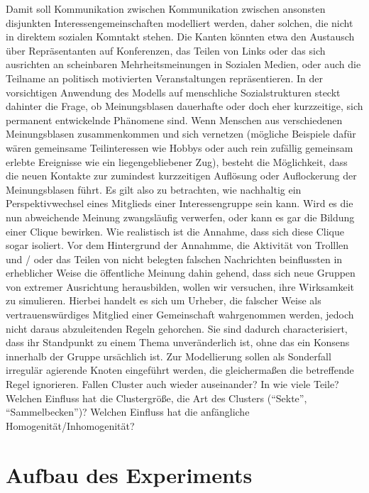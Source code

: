 \documentclass[11pt, a4paper]{scrartcl}
\begin{document}
Damit soll Kommunikation zwischen Kommunikation zwischen ansonsten disjunkten Interessengemeinschaften modelliert werden, daher solchen, die nicht in direktem sozialen Komntakt stehen. Die Kanten könnten etwa den Austausch über Repräsentanten auf Konferenzen,  das Teilen von Links oder das sich ausrichten an scheinbaren Mehrheitsmeinungen in Sozialen Medien, oder auch die Teilname an politisch motivierten Veranstaltungen repräsentieren.
In der vorsichtigen Anwendung des Modells auf menschliche Sozialstrukturen steckt dahinter die Frage, ob Meinungsblasen dauerhafte oder doch eher kurzzeitige, sich permanent entwickelnde Phänomene sind. Wenn Menschen aus verschiedenen Meinungsblasen zusammenkommen und sich vernetzen (mögliche Beispiele dafür wären gemeinsame Teilinteressen wie Hobbys oder auch rein zufällig gemeinsam erlebte Ereignisse wie ein liegengebliebener Zug), besteht die Möglichkeit, dass die neuen Kontakte zur zumindest kurzzeitigen Auflösung oder Auflockerung der Meinungsblasen führt. 
Es gilt also zu betrachten, wie nachhaltig ein Perspektivwechsel eines Mitglieds einer Interessengruppe sein kann. Wird es die nun abweichende Meinung zwangsläufig verwerfen, oder kann es gar die Bildung einer Clique bewirken. Wie realistisch ist die Annahme, dass sich diese Clique sogar isoliert. 
Vor dem Hintergrund der Annahmme, die Aktivität von Trolllen und / oder das Teilen von nicht belegten falschen Nachrichten beinflussten in erheblicher Weise die öffentliche Meinung dahin gehend, dass sich neue Gruppen von  extremer Ausrichtung herausbilden, wollen wir versuchen, ihre Wirksamkeit zu simulieren.
Hierbei handelt es sich um Urheber, die falscher Weise als vertrauenswürdiges Mitglied einer Gemeinschaft  wahrgenommen werden, jedoch nicht daraus abzuleitenden Regeln gehorchen.
Sie sind dadurch characterisiert, dass ihr Standpunkt zu einem Thema unveränderlich ist, ohne das ein Konsens innerhalb der Gruppe ursächlich ist.
Zur Modellierung sollen als Sonderfall irregulär agierende Knoten eingeführt werden, die gleichermaßen die betreffende Regel ignorieren.
Fallen Cluster auch wieder auseinander? In wie viele Teile? Welchen Einfluss hat die Clustergröße, die Art des Clusters ("`Sekte"', "`Sammelbecken"')? Welchen Einfluss hat die anfängliche Homogenität/Inhomogenität?



\section{Aufbau des Experiments}
\end{document}
